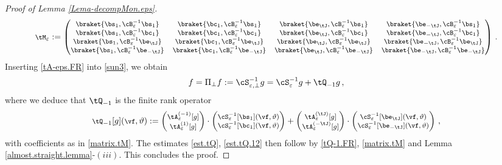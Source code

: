 \documentclass[a4paper,reqno,10pt]{article}
\begin{document}
\begin{proof}[Proof of Lemma \ref{Lema-decompMon.eps}]
\begin{equation}
        \begin{footnotesize}
            \tM_{\varepsilon} := \begin{pmatrix}
            \braket{\bs_{1},\cB_{\varepsilon}^{-1}\bs_{1}} & 	\braket{\bc_{1},\cB_{\varepsilon}^{-1}\bs_{1}} & 	\braket{\be_{\tJ},\cB_{\varepsilon}^{-1}\bs_{1}}  & 	\braket{\be_{-\tJ},\cB_{\varepsilon}^{-1}\bs_{1}} \\
			 \braket{\bs_{1},\cB_{\varepsilon}^{-1}\bc_{1}} & 	\braket{\bc_{1},\cB_{\varepsilon}^{-1}\bc_{1}} & 	\braket{\be_{\tJ},\cB_{\varepsilon}^{-1}\bc_{1}}  & 	\braket{\be_{-\tJ},\cB_{\varepsilon}^{-1}\bc_{1}} \\
			 \braket{\bs_{1},\cB_{\varepsilon}^{-1}\be_{\tJ}} & 	\braket{\bc_{1},\cB_{\varepsilon}^{-1}\be_{\tJ}} & 	\braket{\be_{\tJ},\cB_{\varepsilon}^{-1}\be_{\tJ}}  & 	\braket{\be_{-\tJ},\cB_{\varepsilon}^{-1}\be_{\tJ}} \\
			\braket{\bs_{1},\cB_{\varepsilon}^{-1}\be_{-\tJ}} & 	\braket{\bc_{1},\cB_{\varepsilon}^{-1}\be_{-\tJ}} & 	\braket{\be_{\tJ},\cB_{\varepsilon}^{-1}\be_{-\tJ}}  & 	\braket{\be_{-\tJ},\cB_{\varepsilon}^{-1}\be_{-\tJ}} 
			\end{pmatrix} \,.
        \end{footnotesize}
    \end{equation}
    Inserting \eqref{tA-eps.FR} into \eqref{sun3}, we obtain
    \begin{equation}
        f  = \Pi_{\perp}f := \cS_{\varepsilon,\perp}^{-1} g = \cS_{\varepsilon}^{-1}g + \tQ_{-1}g\,, 
    \end{equation}
    where we deduce that $\tQ_{-1}$ is the finite rank operator
    \begin{equation}\label{tQ-1.FR}
		\begin{footnotesize}
			\tQ_{-1}[g](\vf,\vartheta) := \begin{pmatrix}
			    \tA_{\varepsilon}^{(-1)}[g] \\ \tA_{\varepsilon}^{(1)}[g]
			\end{pmatrix} \cdot \begin{pmatrix}
			   \cS_{\varepsilon}^{-1}[\bs_{1}](\vf,\vartheta) \\  \cS_{\varepsilon}^{-1}[\bc_{1}](\vf,\vartheta)
			\end{pmatrix}     +  \begin{pmatrix}
			    \tA_{\varepsilon}^{(\tJ)}[g] \\ \tA_{\varepsilon}^{(-\tJ)}[g]
			\end{pmatrix}\cdot \begin{pmatrix}
			    \cS_{\varepsilon}^{-1}[\be_{\tJ}](\vf,\vartheta) \\  \cS_{\varepsilon}^{-1}[\be_{-\tJ}](\vf,\vartheta)
			\end{pmatrix}  \,,
		\end{footnotesize}
	\end{equation}
     with coefficients as in \eqref{matrix.tM}. The estimates \eqref{est.tQ}, \eqref{est.tQ.12} then follow by \eqref{tQ-1.FR}, \eqref{matrix.tM} and  Lemma \ref{almost.straight.lemma}-$(iii)$. This concludes the proof.
\end{proof}
\end{document}
